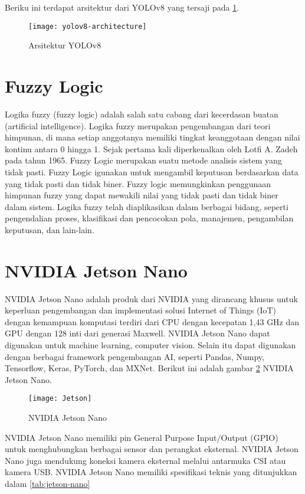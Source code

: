 Beriku ini terdapat  arsitektur dari YOLOv8 yang tersaji pada \cref{fig:yolov8}.
\begin{figure}[H]
	\centering
	\texttt{[image: yolov8-architecture]}
	\caption{Arsitektur YOLOv8}
	\label{fig:yolov8}
\end{figure}

\section{Fuzzy Logic}
Logika fuzzy (fuzzy logic) adalah salah satu cabang dari kecerdasan buatan (artificial intelligence). Logika fuzzy merupakan pengembangan dari teori himpunan, di mana setiap anggotanya memiliki tingkat keanggotaan dengan nilai kontinu antara 0 hingga 1. Sejak pertama kali diperkenalkan oleh Lotfi A. Zadeh pada tahun 1965. Fuzzy Logic merupakan suatu metode analisis sistem yang tidak pasti. Fuzzy Logic igunakan untuk mengambil keputusan berdasarkan data yang tidak pasti dan tidak biner. Fuzzy logic memungkinkan penggunaan himpunan fuzzy yang dapat mewakili nilai yang tidak pasti dan tidak biner dalam sistem. Logika fuzzy telah diaplikasikan dalam berbagai bidang, seperti pengendalian proses, klasifikasi dan pencocokan pola, manajemen, pengambilan keputusan, dan lain-lain.

\section{NVIDIA Jetson Nano}
NVIDIA Jetson Nano adalah produk dari NVIDIA yang dirancang khusus untuk keperluan pengembangan dan implementasi solusi Internet of Things (IoT) dengan kemampuan komputasi terdiri dari CPU dengan kecepatan 1,43 GHz dan GPU dengan 128 inti dari generasi Maxwell. NVIDIA Jetson Nano dapat digunakan untuk machine learning, computer vision. Selain itu dapat digunakan dengan berbagai framework pengembangan AI, seperti Pandas, Numpy, Tensorflow, Keras, PyTorch, dan MXNet. Berikut ini adalah gambar \cref{fig:jetson} NVIDIA Jetson Nano.

\begin{figure}[H]
	\centering
	\texttt{[image: Jetson]}
	\caption{NVIDIA Jetson Nano}
	\label{fig:jetson}
\end{figure}

NVIDIA Jetson Nano memiliki pin General Purpose Input/Output (GPIO) untuk menghubungkan berbagai sensor dan perangkat eksternal. NVIDIA Jetson Nano juga mendukung koneksi kamera eksternal melalui antarmuka CSI atau kamera USB. NVIDIA Jetson Nano memiliki spesifikasi teknis yang ditunjukkan dalam \cref{tab:jetson-nano}	

